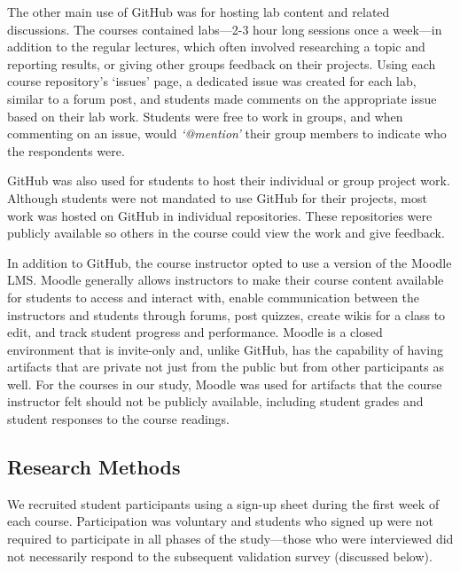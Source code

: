 The other main use of GitHub was for hosting lab content and related discussions. The courses contained labs---2-3 hour long sessions once a week---in addition to the regular lectures, which often involved researching a topic and reporting results, or giving other groups feedback on their projects. Using each course repository's `issues' page, a dedicated issue was created for each lab, similar to a forum post, and students made comments on the appropriate issue based on their lab work. Students were free to work in groups, and when commenting on an issue, would \emph{`@mention'} their group members to indicate who the respondents were.

GitHub was also used for students to host their individual or group project work. Although students were not mandated to use GitHub for their projects, most work was hosted on GitHub in individual repositories. These repositories were publicly available so others in the course could view the work and give feedback.

In addition to GitHub, the course instructor opted to use a version of the Moodle LMS. Moodle generally allows instructors to make their course content available for students to access and interact with, enable communication between the instructors and students through forums, post quizzes, create wikis for a class to edit, and track student progress and performance. Moodle is a closed environment that is invite-only and, unlike GitHub, has the capability of having artifacts that are private not just from the public but from other participants as well. For the courses in our study, Moodle was used for artifacts that the course instructor felt should not be publicly available, including student grades and student responses to the course readings.

\subsection{Research Methods}
We recruited student participants using a sign-up sheet during the first week of each course. Participation was voluntary and students who signed up were not required to participate in all phases of the study---those who were interviewed did not necessarily respond to the subsequent validation survey (discussed below).

